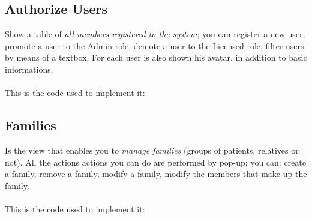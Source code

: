 


\subsection{Authorize Users}

Show a table of \emph{all members registered to the system}; you can register a new user, promote a user to the Admin role, demote a user to the Licensed role, filter users by means of a textbox. For each user is also shown his avatar, in addition to basic informations. 
\\
\\This is the code used to implement it: 





\subsection{Families}

Is the view that enables you to \emph{manage families} (groups of patients, relatives or not). All the actions actions you can do are performed by pop-up; you can: create a family, remove a family, modify a family, modify the members that make up the family. 
\\
\\This is the code used to implement it: 



